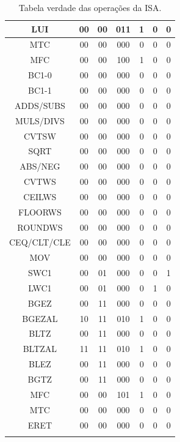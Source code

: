 \documentclass[12pt]{article}
\begin{document}
\begin{longtable}{|c|c|c|c|c|c|c|}
		 LUI & 00 & 00 & 011 & 1 & 0 & 0\\\hline	
		 MTC & 00 & 00 & 000 & 0 & 0 & 0\\\hline
		 MFC & 00 & 00 & 100 & 1 & 0 & 0\\\hline
		 BC1-0 & 00 & 00 & 000 & 0 & 0 & 0\\\hline	
		 BC1-1 & 00 & 00 & 000 & 0 & 0 & 0\\\hline
		 ADDS/SUBS & 00 & 00 & 000 & 0 & 0 & 0\\\hline
		 MULS/DIVS & 00 & 00 & 000 & 0 & 0 & 0\\\hline
		 CVTSW & 00 & 00 & 000 & 0 & 0 & 0\\\hline	
		 SQRT & 00 & 00 & 000 & 0 & 0 & 0\\\hline
		 ABS/NEG & 00 & 00 & 000 & 0 & 0 & 0\\\hline
		 CVTWS & 00 & 00 & 000 & 0 & 0 & 0\\\hline
		 CEILWS & 00 & 00 & 000 & 0 & 0 & 0\\\hline
		 FLOORWS & 00 & 00 & 000 & 0 & 0 & 0\\\hline
		 ROUNDWS & 00 & 00 & 000 & 0 & 0 & 0\\\hline	
		 CEQ/CLT/CLE & 00 & 00 & 000 & 0 & 0 & 0\\\hline
		 MOV & 00 & 00 & 000 & 0 & 0 & 0\\\hline
		 SWC1 & 00 & 01 & 000 & 0 & 0 & 1\\\hline	
		 LWC1 & 00 & 01 & 000 & 0 & 1 & 0\\\hline
		 BGEZ & 00 & 11 & 000 & 0 & 0 & 0\\\hline	
		 BGEZAL & 10 & 11 & 010 & 1 & 0 & 0\\\hline
		 BLTZ & 00 & 11 & 000 & 0 & 0 & 0\\\hline
		 BLTZAL & 11 & 11 & 010 & 1 & 0 & 0\\\hline
		 BLEZ & 00 & 11 & 000 & 0 & 0 & 0\\\hline
		 BGTZ & 00 & 11 & 000 & 0 & 0 & 0\\\hline
		 MFC & 00 & 00 & 101 & 1 & 0 & 0\\\hline	
		 MTC & 00 & 00 & 000 & 0 & 0 & 0\\\hline
		 ERET & 00 & 00 & 000 & 0 & 0 & 0\\\hline			
	\caption{Tabela verdade das operações da ISA.}
	\label{tab:req21}
\end{longtable}
\end{document}
